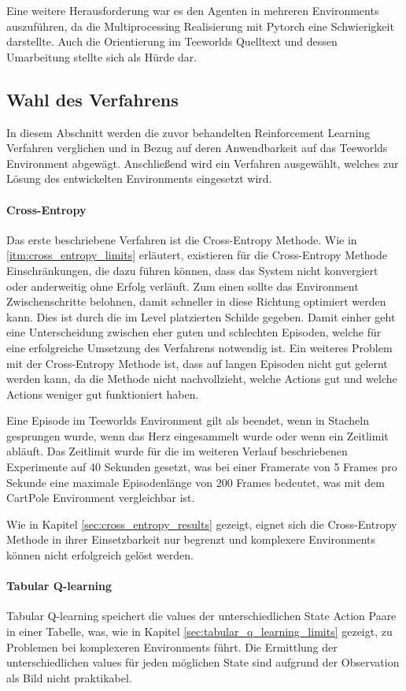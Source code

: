 \documentclass[11pt]{scrartcl}
\begin{document}
Eine weitere Herausforderung war es den Agenten in mehreren Environments auszuführen, da
die Multiprocessing Realisierung mit Pytorch eine Schwierigkeit darstellte. Auch die
Orientierung im Teeworlds Quelltext und dessen Umarbeitung stellte sich als Hürde dar.

\subsection{Wahl des Verfahrens}
In diesem Abschnitt werden die zuvor behandelten Reinforcement Learning Verfahren
verglichen und in Bezug auf deren Anwendbarkeit auf das Teeworlds Environment abgewägt.
Anschließend wird ein Verfahren ausgewählt, welches zur Lösung des entwickelten
Environments eingesetzt wird.

\paragraph{Cross-Entropy}
Das erste beschriebene Verfahren ist die Cross-Entropy Methode. Wie in
\autoref{itm:cross_entropy_limits} erläutert, existieren für die Cross-Entropy Methode
Einschränkungen, die dazu führen können, dass das System nicht konvergiert oder anderweitig
ohne Erfolg verläuft. Zum einen sollte das Environment Zwischenschritte belohnen,
damit schneller in diese Richtung optimiert werden kann. Dies ist durch die im Level
platzierten Schilde gegeben. Damit einher geht eine Unterscheidung zwischen eher guten
und schlechten Episoden, welche für eine erfolgreiche Umsetzung des Verfahrens notwendig
ist. Ein weiteres Problem mit der Cross-Entropy Methode ist, dass auf langen Episoden
nicht gut gelernt werden kann, da die Methode nicht nachvollzieht, welche Actions gut
und welche Actions weniger gut funktioniert haben. 

Eine Episode im Teeworlds Environment gilt als beendet, wenn in Stacheln gesprungen wurde, 
wenn das Herz eingesammelt wurde oder wenn ein Zeitlimit abläuft. Das Zeitlimit wurde für
die im weiteren Verlauf beschriebenen Experimente auf 40 Sekunden gesetzt, was bei einer
Framerate von 5 Frames pro Sekunde eine maximale Episodenlänge von 200 Frames bedeutet,
was mit dem CartPole Environment vergleichbar ist.

Wie in Kapitel \ref{sec:cross_entropy_results} gezeigt, eignet sich die Cross-Entropy
Methode in ihrer Einsetzbarkeit nur begrenzt und komplexere Environments können nicht
erfolgreich gelöst werden.

\paragraph{Tabular Q-learning}
Tabular Q-learning speichert die values der unterschiedlichen State Action Paare in einer
Tabelle, was, wie in Kapitel \ref{sec:tabular_q_learning_limits} gezeigt, zu Problemen bei
komplexeren Environments führt. Die Ermittlung der unterschiedlichen values für jeden
möglichen State sind aufgrund der Observation als Bild nicht praktikabel.
\end{document}
